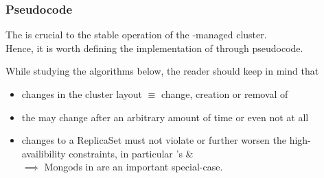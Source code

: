 \subsubsection{Pseudocode}

The  is crucial to the stable operation of the \mamid-managed cluster.\\
Hence, it is worth defining the implementation of  through pseudocode. %

While studying the algorithms below, the reader should keep in mind that
\begin{itemize}
  \item changes in the cluster layout $\equiv$ change, creation or removal of 
  \item the  may change after an arbitrary amount of time or even not at all
  \item changes to a ReplicaSet must not violate or further worsen the high-availibility constraints,
        in particular 's  \& \\
        $\implies$ Mongods in  are an important special-case.
\end{itemize}


